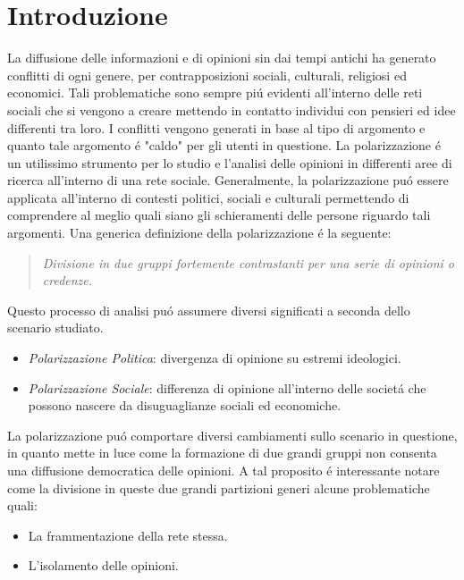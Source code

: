 \chapter{Introduzione}
\label{Introduzione}



La diffusione delle informazioni e di opinioni sin dai tempi antichi ha generato conflitti di ogni genere, per contrapposizioni sociali, culturali, religiosi ed economici. Tali problematiche sono sempre pi\'u evidenti all'interno delle reti sociali che si vengono a creare mettendo in contatto individui con pensieri ed idee differenti tra loro. I conflitti vengono generati in base al tipo di argomento e quanto tale argomento \'e "caldo" per gli utenti in questione. 
La polarizzazione \'e un utilissimo strumento per lo studio e l'analisi delle opinioni in differenti aree di ricerca all'interno di una rete sociale. Generalmente, la polarizzazione pu\'o essere applicata all'interno di contesti politici, sociali e culturali permettendo di comprendere al meglio quali siano  gli schieramenti delle persone riguardo tali argomenti. Una generica definizione della polarizzazione \'e la seguente:
\begin{quote} 
\textit{Divisione in due gruppi fortemente contrastanti per una serie di opinioni o credenze.}
\end{quote}
Questo processo di analisi pu\'o assumere diversi significati a seconda dello scenario studiato. 
\begin{itemize}
\item \textit{Polarizzazione Politica}: divergenza di opinione su estremi ideologici.
\item \textit{Polarizzazione Sociale}: differenza di opinione all'interno delle societ\'a che possono nascere da disuguaglianze sociali ed economiche.

\end{itemize}

La polarizzazione pu\'o comportare diversi cambiamenti sullo scenario in questione, in quanto mette in luce come la formazione di due grandi gruppi non consenta una diffusione democratica delle opinioni. A tal proposito \'e interessante notare come la divisione in queste due grandi partizioni generi alcune problematiche quali:
\begin{itemize}
\item La frammentazione della rete stessa.
\item L'isolamento delle opinioni. 
\end{itemize} 

